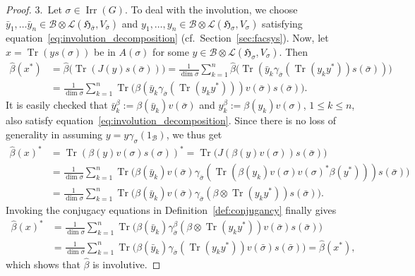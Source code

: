 \documentclass[11pt]{article}
\numberwithin{equation}{section}
\numberwithin{equation}{section}
\newcommand*{\tensor}{\otimes}		%
\DeclareMathOperator{\Tr}{Tr}		%
\newcommand*{\hilb}{\mathfrak}		%
\newcommand*{\alg}{\mathcal}		%
\newcommand*{\hH}{\hilb{H}}			%
\newcommand*{\one}{1}				%
\newcommand*{\aB}{\alg{B}} 			%
\newcommand*{\End}{\mathcal{L}} %
\DeclareMathOperator{\Irrep}{Irr} 			%
\begin{document}
\begin{proof}
3.~Let $\sigma \in \Irrep(G)$.
		To deal with the involution, we choose $\bar y_1, \dots \bar y_n \in \aB \tensor \End(\hH_{\bar\sigma}, V_{\bar\sigma})$ and $y_1, \dots, y_n \in \aB \tensor \End(\hH_\sigma, V_\sigma)$ satisfying equation~\eqref{eq:involution_decomposition} (cf.~Section~\ref{sec:facsys}).
		Now, let $x = \Tr ( y s(\sigma) )$ be in $A(\sigma)$ for some $y \in \aB \tensor \End(\hH_\sigma, V_\sigma)$.
		Then
		\begin{align*}
			\hat\beta(x^*)
			&= \hat\beta \bigl( \Tr ( J(y) s(\bar \sigma) ) \bigr)
			= \frac{1}{\dim \sigma} \sum_{k=1}^n \hat\beta \bigl( \Tr ( \bar y_k \gamma_{\bar\sigma} (\Tr(y_k y^*) ) s(\bar \sigma) ) \bigr)
			\\
			&=
			\frac{1}{\dim \sigma} \sum_{k=1}^n \Tr \bigl( \beta ( \bar y_k \gamma_{\bar \sigma} ( \Tr(y_k y^*) ) ) v(\bar \sigma) s(\bar\sigma) \bigr).
		\end{align*}
		It is easily checked that $\bar y_k^\beta := \beta(\bar y_k) v(\bar\sigma)$ and $y_k^\beta := \beta(y_k)v(\sigma)$, $1 \le k \le n$, also satisfy equation~\eqref{eq:involution_decomposition}.
		Since there is no loss of generality in assuming $y = y \gamma_\sigma(\one_\aB)$, we thus get
		\begin{align*}
			\hat\beta(x)^*
			&= \Tr ( \beta(y) v(\sigma) s(\sigma) )^*
			= \Tr \bigl( J ( \beta(y) v(\sigma) ) s(\bar\sigma) \bigr)
			\\
			&=
			\frac{1}{\dim \sigma} \sum_{k=1}^n \Tr \bigl( \beta(\bar y_k) v(\bar\sigma) \gamma_{\bar\sigma} ( \Tr ( \beta(y_k) v(\sigma) v(\sigma)^* \beta(y^*) ) ) s(\bar \sigma) \bigr)
			\\
			&=
			\frac{1}{\dim \sigma} \sum_{k=1}^n \Tr \bigl( \beta(\bar y_k) v(\bar\sigma) \gamma_{\bar\sigma} ( \beta \tensor \Tr( y_k y^*) ) s(\bar \sigma) \bigr).
		\end{align*}
		Invoking the conjugacy equations in Definition~\ref{def:conjugancy} finally gives
		\begin{align*}
			\hat\beta(x)^*
			&=
			\frac{1}{\dim \sigma} \sum_{k=1}^n \Tr \bigl( \beta(\bar y_k) \gamma^\beta_{\bar\sigma} ( \beta \tensor \Tr( y_k y^*) ) v(\bar\sigma) s(\bar \sigma) \bigr)
			\\
			&=
			\frac{1}{\dim \sigma} \sum_{k=1}^n \Tr \bigl( \beta ( \bar y_k) \gamma_{\bar\sigma}( \Tr( y_k y^*) ) v(\bar\sigma) s(\bar \sigma)\bigr)
			= \hat\beta(x^*),
		\end{align*}
		which shows that $\hat \beta$ is involutive.
\end{proof}
\end{document}
